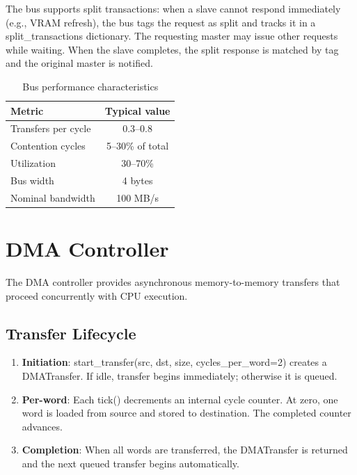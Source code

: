 \documentclass[12pt,a4paper,twoside]{book}
\theoremstyle{trinarytheorem}
\theoremstyle{trinarydefinition}
\newcommand{\code}[1]{\textsf{#1}}
\begin{document}
The bus supports split transactions: when a slave cannot respond
immediately (e.g., VRAM refresh), the bus tags the request as split
and tracks it in a \code{split\_transactions} dictionary. The requesting
master may issue other requests while waiting. When the slave completes,
the split response is matched by tag and the original master is notified.

\begin{table}[H]
\centering
\caption{Bus performance characteristics}
\label{tab:busperf}
\begin{tabular}{lc}
\toprule
Metric & Typical value \\
\midrule
Transfers per cycle & 0.3--0.8 \\
Contention cycles & 5--30\% of total \\
Utilization & 30--70\% \\
Bus width & 4 bytes \\
Nominal bandwidth & 100 MB/s \\
\bottomrule
\end{tabular}
\end{table}

\section{DMA Controller}

The \code{DMA} controller provides asynchronous memory-to-memory
transfers that proceed concurrently with CPU execution.

\subsection{Transfer Lifecycle}

\begin{enumerate}
    \item \textbf{Initiation}: \code{start\_transfer(src, dst, size,
          cycles\_per\_word=2)} creates a \code{DMATransfer}. If idle,
          transfer begins immediately; otherwise it is queued.
    \item \textbf{Per-word}: Each \code{tick()} decrements an internal
          cycle counter. At zero, one word is loaded from source and
          stored to destination. The \code{completed} counter advances.
    \item \textbf{Completion}: When all words are transferred, the
          \code{DMATransfer} is returned and the next queued transfer
          begins automatically.
\end{enumerate}
\end{document}
